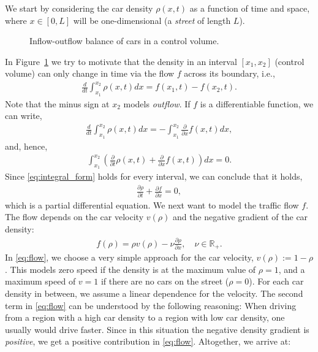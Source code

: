 \documentclass[a4paper,10pt]{article}
\begin{document}
We start by considering the car density $\rho(x,t)$ as a function of time and space, where $x\in[0,L]$ will be one-dimensional (a \textit{street} of length $L$).
\begin{figure}[ht]
\centering
{}
\caption{Inflow-outflow balance of cars in a control volume.}\label{car_flow}
\end{figure}
In \mbox{Figure \ref{car_flow}} we try to motivate that the density in an interval $[x_1,x_2]$ (control volume) can only change in time via the flow $f$ across its boundary, i.e.,
\begin{align*}
 \frac{d}{dt} \int_{x_1}^{x_2} \rho(x,t) dx =  f(x_1,t) - f(x_2,t).
\end{align*}
Note that the minus sign at $x_2$ models \textit{outflow}. If $f$ is a differentiable function, we can write,
\begin{align*}
 \frac{d}{dt} \int_{x_1}^{x_2} \rho(x,t) dx =  -\int_{x_1}^{x_2} \frac{\partial}{\partial x} f(x,t) dx,
\end{align*}
and, hence,
\begin{align}
\label{eq:integral_form}
 \int_{x_1}^{x_2} \left( \frac{\partial}{\partial t}\rho(x,t) + \frac{\partial}{\partial x} f(x,t) \right) dx = 0.
\end{align}
Since \eqref{eq:integral_form} holds for every interval, we can conclude that it holds, 
\begin{align*}
 \frac{\partial \rho}{\partial t} + \frac{\partial f}{\partial x}  = 0,
\end{align*}
which is a partial differential equation. We next want to model the traffic flow $f$. The flow depends on the car velocity $v(\rho)$ and the negative gradient of the car density:
\begin{align}
\label{eq:flow}
 f(\rho) = \rho v(\rho) - \nu \frac{\partial \rho}{\partial x}, \quad \nu \in \mathbb{R}_+.
\end{align}
In \eqref{eq:flow}, we choose a very simple approach for the car velocity, $v(\rho) := 1 - \rho$. This models zero speed if the density is at the maximum value of $\rho = 1$, and a maximum speed of $v = 1$ if there are no cars on the street ($\rho = 0$). For each car density in between, we assume a linear dependence for the velocity. The second term in \eqref{eq:flow} can be understood by the following reasoning: When driving from a region with a high car density to a region with low car density, one usually would drive faster. Since in this situation the negative density gradient is \textit{positive}, we get a positive contribution in \eqref{eq:flow}. Altogether, we arrive at:
\end{document}
